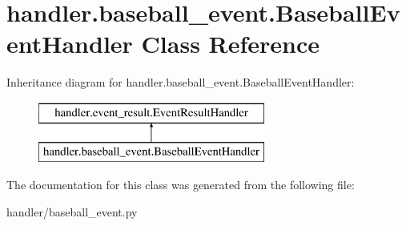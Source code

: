 \hypertarget{classhandler_1_1baseball__event_1_1_baseball_event_handler}{}\section{handler.\+baseball\+\_\+event.\+Baseball\+Event\+Handler Class Reference}
\label{classhandler_1_1baseball__event_1_1_baseball_event_handler}
Inheritance diagram for handler.\+baseball\+\_\+event.\+Baseball\+Event\+Handler\+:\begin{figure}[H]
\begin{center}
\leavevmode
\includegraphics[height=2.000000cm]{classhandler_1_1baseball__event_1_1_baseball_event_handler}
\end{center}
\end{figure}


The documentation for this class was generated from the following file\+:\begin{DoxyCompactItemize}
\item 
handler/baseball\+\_\+event.\+py\end{DoxyCompactItemize}
